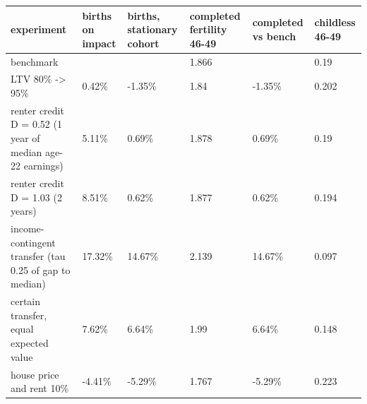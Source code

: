 \begingroup\small
\setlength{\tabcolsep}{3pt}
\renewcommand{\arraystretch}{1.04}
\begin{tabularx}{\linewidth}{XXXXXX}
\toprule
experiment & births on impact & births, stationary cohort & completed fertility 46-49 & completed vs bench & childless 46-49 \\
\midrule
benchmark &  &  & 1.866 &  & 0.19 \\
LTV 80\% -\textgreater{} 95\% & 0.42\% & -1.35\% & 1.84 & -1.35\% & 0.202 \\
renter credit D = 0.52 (1 year of median age-22 earnings) & 5.11\% & 0.69\% & 1.878 & 0.69\% & 0.19 \\
renter credit D = 1.03 (2 years) & 8.51\% & 0.62\% & 1.877 & 0.62\% & 0.194 \\
income-contingent transfer (tau 0.25 of gap to median) & 17.32\% & 14.67\% & 2.139 & 14.67\% & 0.097 \\
certain transfer, equal expected value & 7.62\% & 6.64\% & 1.99 & 6.64\% & 0.148 \\
house price and rent 10\% & -4.41\% & -5.29\% & 1.767 & -5.29\% & 0.223 \\
\bottomrule
\end{tabularx}
\endgroup
